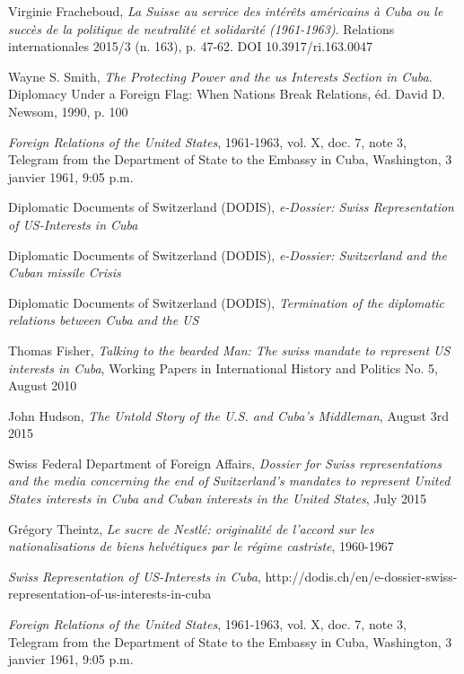 \documentclass[a4paper]{article}
\begin{document}
\begin{thebibliography}{9}
  Virginie Fracheboud, \emph{La Suisse au service des intérêts américains à Cuba ou le succès de la politique de neutralité et solidarité (1961-1963)}. Relations internationales 2015/3 (n. 163), p. 47-62. DOI 10.3917/ri.163.0047
    
Wayne S. Smith, \emph{The Protecting Power and the us Interests Section in Cuba}. Diplomacy Under a Foreign Flag: When Nations Break Relations, \'ed. David D. Newsom, 1990, p. 100

\emph{Foreign Relations of the United States}, 1961-1963, vol. X, doc. 7, note 3, Telegram from the Department of State to the Embassy in Cuba, Washington, 3 janvier 1961, 9:05 p.m.

Diplomatic Documents of Switzerland (DODIS), \emph{e-Dossier: Swiss Representation of US-Interests in Cuba}

Diplomatic Documents of Switzerland (DODIS), \emph{e-Dossier: Switzerland and the Cuban missile Crisis}

Diplomatic Documents of Switzerland (DODIS), \emph{Termination of the diplomatic relations between Cuba and the US}

Thomas Fisher, \emph{Talking to the bearded Man: The swiss mandate to represent US interests in Cuba}, Working Papers in International History and Politics No. 5, August 2010

John Hudson, \emph{The Untold Story of the U.S. and Cuba’s Middleman}, August 3rd 2015

Swiss Federal Department of Foreign Affairs, \emph{Dossier for Swiss representations and the media concerning the end of Switzerland’s mandates to represent United States interests in Cuba and Cuban interests in the United States}, July 2015


Grégory Theintz, \emph{Le sucre de Nestl\'e: originalité de l'accord sur les nationalisations de biens helvétiques par le régime castriste}, 1960-1967

\emph{Swiss Representation of US-Interests in Cuba}, http://dodis.ch/en/e-dossier-swiss-representation-of-us-interests-in-cuba

\emph{Foreign Relations of the United States}, 1961-1963, vol. X, doc. 7, note 3, Telegram from the Department of State to the Embassy in Cuba, Washington, 3 janvier 1961, 9:05 p.m.





\end{thebibliography}
\end{document}
